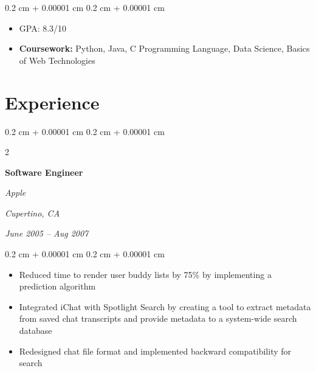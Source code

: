 \documentclass[10pt, letterpaper]{article}
\newenvironment{highlights}{
    \begin{itemize}[
        topsep=0.10 cm,
        parsep=0.10 cm,
        partopsep=0pt,
        itemsep=0pt,
        leftmargin=0.4 cm + 10pt
    ]
}{
    \end{itemize}
} %
\newenvironment{onecolentry}{
    \begin{adjustwidth}{
        0.2 cm + 0.00001 cm
    }{
        0.2 cm + 0.00001 cm
    }
}{
    \end{adjustwidth}
} %
\newenvironment{twocolentry}[2][]{
    \onecolentry
    \def\secondColumn{#2}
    \setcolumnwidth{\fill, 4.5 cm}
    \begin{paracol}{2}
}{
    \switchcolumn \raggedleft \secondColumn
    \end{paracol}
    \endonecolentry
} %
\let\hrefWithoutArrow\href
\renewcommand{\href}[2]{\hrefWithoutArrow{#1}{\ifthenelse{\equal{#2}{}}{ }{#2 }\raisebox{.15ex}{\footnotesize \faExternalLink*}}}
\begin{document}
        \vspace{0.10 cm}
        \begin{onecolentry}
            \begin{highlights}
                \item GPA: 8.3/10
                \item \textbf{Coursework:} Python, Java, C Programming Language, Data Science, Basics of Web Technologies
            \end{highlights}
        \end{onecolentry}



    
    \section{Experience}



        
        \begin{twocolentry}{
        \textit{Cupertino, CA}    
            
        \textit{June 2005 – Aug 2007}}
            \textbf{Software Engineer}
            
            \textit{Apple}
        \end{twocolentry}

        \vspace{0.10 cm}
        \begin{onecolentry}
            \begin{highlights}
                \item Reduced time to render user buddy lists by 75\% by implementing a prediction algorithm
                \item Integrated iChat with Spotlight Search by creating a tool to extract metadata from saved chat transcripts and provide metadata to a system-wide search database
                \item Redesigned chat file format and implemented backward compatibility for search
            \end{highlights}
        \end{onecolentry}


        \vspace{0.2 cm}
\end{document}

